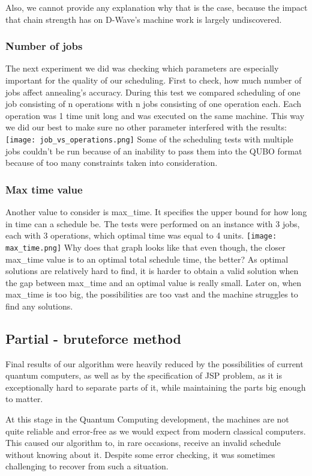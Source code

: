 \documentclass[letterpaper, 11pt]{article}
\begin{document}
\begin{multicols}{2}
Also, we cannot provide any explanation why that is the case, because
the impact that chain strength has on D-Wave's machine work is largely
undiscovered. 

\subsubsection{Number of jobs}
The next experiment we did was checking which parameters are especially
important for the quality of our scheduling. First to check, how much
number of jobs affect annealing's accuracy. During this test we compared
scheduling of one job consisting of n operations with n jobs consisting of
one operation each. Each operation was 1 time unit long and was executed
on the same machine. This way we did our best to make sure no other
parameter interfered with the results: 
\texttt{[image: job\_vs\_operations.png]}
Some of the scheduling tests with multiple jobs couldn't be run because of
an inability to pass them into the QUBO format because of too many constraints
taken into consideration. 

\subsubsection{Max time value}
Another value to consider is max\_time. It specifies the upper bound
for how long in time can a schedule be. The tests were performed
on an instance with 3 jobs, each with 3 operations, which optimal
time was equal to 4 units.
\texttt{[image: max\_time.png]}
Why does that graph looks like that even though, the closer
max\_time value is to an optimal total schedule time, the better? As optimal
solutions are relatively hard to find, it is harder to obtain a valid solution
when the gap between max\_time and an optimal value is really small.
Later on, when max\_time is too big, the possibilities are too vast
and the machine struggles to find any solutions.

\subsection{Partial - bruteforce method}
Final results of our algorithm were heavily reduced by the
possibilities of current quantum computers, as well as by the
specification of JSP problem, as it is exceptionally hard to
separate parts of it, while maintaining the parts big enough to
matter.

At this stage in the Quantum Computing development, the machines
are not quite reliable and error-free as we would expect from 
modern classical computers. This caused our algorithm to, in rare
occasions, receive an invalid schedule without knowing about it.
Despite some error checking, it was sometimes challenging to 
recover from such a situation.


\end{multicols}
\end{document}
